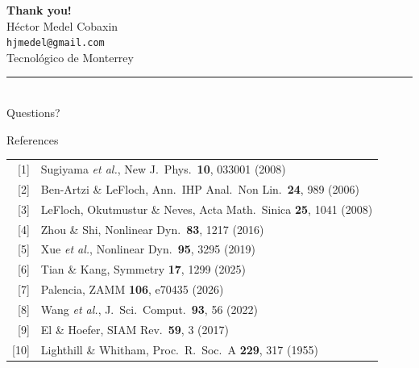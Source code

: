 \documentclass[aspectratio=169,11pt]{beamer}
\newcommand{\mcite}[1]{{\scriptsize\color{Cg}[#1]}}
\begin{document}
\begin{frame}[plain]
  \begin{center}
  \vspace{1.2cm}
  {\Huge\bfseries\color{C1} Thank you!}\\[18pt]
  {\large H\'ector Medel Cobaxin}\\[4pt]
  {\normalsize\texttt{hjmedel@gmail.com}}\\[4pt]
  {\small Tecnol\'ogico de Monterrey}\\[20pt]
  \rule{0.55\linewidth}{0.4pt}\\[12pt]
  {\small
    Questions?
  }
  \end{center}
\end{frame}

\appendix

\begin{frame}[noframenumbering]{References}
\footnotesize
\renewcommand{\arraystretch}{1.2}
\begin{tabular}{@{}rl@{}}
\mcite{1} & Sugiyama \emph{et al.}, New J.\ Phys.\ \textbf{10}, 033001 (2008) \\
\mcite{2} & Ben-Artzi \& LeFloch, Ann.\ IHP Anal.\ Non Lin.\ \textbf{24}, 989 (2006) \\
\mcite{3} & LeFloch, Okutmustur \& Neves, Acta Math.\ Sinica \textbf{25}, 1041 (2008) \\
\mcite{4} & Zhou \& Shi, Nonlinear Dyn.\ \textbf{83}, 1217 (2016) \\
\mcite{5} & Xue \emph{et al.}, Nonlinear Dyn.\ \textbf{95}, 3295 (2019) \\
\mcite{6} & Tian \& Kang, Symmetry \textbf{17}, 1299 (2025) \\
\mcite{7} & Palencia, ZAMM \textbf{106}, e70435 (2026) \\
\mcite{8} & Wang \emph{et al.}, J.\ Sci.\ Comput.\ \textbf{93}, 56 (2022) \\
\mcite{9} & El \& Hoefer, SIAM Rev.\ \textbf{59}, 3 (2017) \\
\mcite{10} & Lighthill \& Whitham, Proc.\ R.\ Soc.\ A \textbf{229}, 317 (1955) \\
\end{tabular}
\end{frame}
\end{document}
